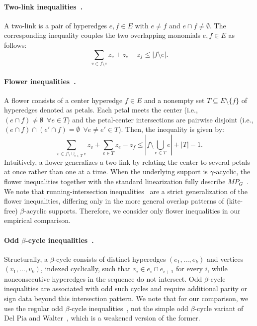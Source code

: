 \paragraph{Two-link inequalities~\cite{cramaRodriguezHeck2017valid}.} A two-link
is a pair of hyperedges $e,f\in E$ with $e\neq f$ and $e\cap f\neq\emptyset$. The corresponding inequality couples the two overlapping monomials $e,f\in E$ as follows:
\[
\sum_{v\in f\setminus e} z_v + z_e - z_f \le |f\setminus e|.
\]

\paragraph{Flower inequalities~\cite{delPiaKhajavirad2018acyclic}.}
A flower consists of a center hyperedge $f\in E$ and a nonempty set
$T\subseteq E\setminus\{f\}$ of hyperedges denoted as petals. Each petal meets the center (i.e., $(e\cap f)\neq\emptyset \ \; \forall e\in T$) and the petal-center intersections are pairwise disjoint (i.e., $(e\cap f)\cap(e'\cap f)=\emptyset \ \; \forall e\ne e'\in T$). Then, the inequality is given by:
%
\[
\sum_{v \in f \setminus \cup_{e \in T} e} z_v + \sum_{e \in T} z_e - z_f
\le
\left|f \setminus \bigcup_{e \in T} e\right| + |T| - 1.
\]
Intuitively, a flower generalizes a two-link by relating the center to several petals at
once rather than one at a time. When the underlying support is $\gamma$-acyclic, the flower inequalities together with the standard linearization fully describe $MP_G$~\cite{delPiaKhajavirad2018acyclic}. We note that running-intersection 
inequalities~\cite{delPiaKhajavirad2021running} are a strict generalization of the flower inequalities, differing only in the more general overlap patterns of (kite-free) $\beta$-acyclic supports. Therefore, we consider only flower inequalities in our empirical comparison.


\paragraph{Odd $\beta$-cycle inequalities~\cite{delPiaDiGregorio2021chvatal}.}
Structurally, a $\beta$-cycle consists of distinct hyperedges
$(e_1,\ldots,e_k)$ and vertices $(v_1,\ldots,v_k)$, indexed cyclically, such
that $v_i\in e_i\cap e_{i+1}$ for every $i$, while nonconsecutive hyperedges in the
sequence do not intersect. Odd $\beta$-cycle inequalities are associated with odd such
cycles and require additional parity or sign data beyond this intersection pattern. We note that for our comparison, we use the regular odd $\beta$-cycle inequalities~\cite{delPiaDiGregorio2021chvatal}, not the simple odd $\beta$-cycle variant of Del Pia and Walter~\cite{delPiaWalter2024simple}, which is a weakened version of the former.
